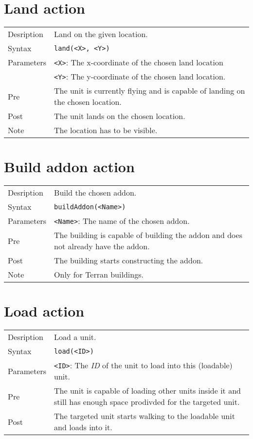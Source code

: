 \section{Land action}
\begin{tabularx}{\textwidth}{lX}
 Desription & Land on the given location. \\
 Syntax & \verb|land(<X>, <Y>)| \\
 Parameters & \verb|<X>|: The x-coordinate of the chosen land location \\
            & \verb|<Y>|: The y-coordinate of the chosen land location. \\
 Pre & The unit is currently flying and is capable of landing on the chosen location. \\
 Post & The unit lands on the chosen location. \\
 Note & The location has to be visible.
\end{tabularx}

\section{Build addon action}
\begin{tabularx}{\textwidth}{lX}
 Desription & Build the chosen addon. \\
 Syntax & \verb|buildAddon(<Name>)| \\
 Parameters & \verb|<Name>|: The name of the chosen addon.\\
 Pre & The building is capable of building the addon and does not already have the addon. \\
 Post & The building starts constructing the addon. \\
 Note & Only for Terran buildings.
\end{tabularx}

\section{Load action}
\begin{tabularx}{\textwidth}{lX}
 Desription & Load a unit. \\
 Syntax & \verb|load(<ID>)| \\
 Parameters & \verb|<ID>|: The \textit{ID} of the unit to load into this (loadable) unit.\\
 Pre & The unit is capable of loading other units inside it and still has enough space prodivded for the targeted unit. \\
 Post & The targeted unit starts walking to the loadable unit and loads into it.
\end{tabularx}

